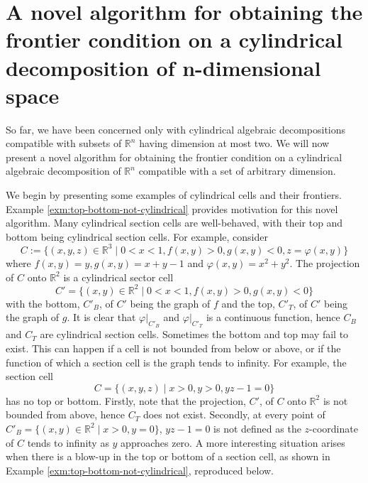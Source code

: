 \documentclass[
]{book}
\theoremstyle{definition}
\theoremstyle{definition}
\theoremstyle{definition}
\theoremstyle{definition}
\theoremstyle{remark}
\begin{document}
\hypertarget{sec:novel-frontier}{%
\chapter{A novel algorithm for obtaining the frontier condition on a cylindrical decomposition of n-dimensional space}\label{sec:novel-frontier}}

So far, we have been concerned only with cylindrical algebraic decompositions compatible with subsets of \(\mathbb{R}^n\) having dimension at most two. We will now present a novel algorithm for obtaining the frontier condition on a cylindrical algebraic decomposition of \(\mathbb{R}^n\) compatible with a set of arbitrary dimension.

We begin by presenting some examples of cylindrical cells and their frontiers. Example \ref{exm:top-bottom-not-cylindrical} provides motivation for this novel algorithm.
Many cylindrical section cells are well-behaved, with their top and bottom being cylindrical section cells.
For example, consider
\[
C := \{ (x,y,z) \in \mathbb{R}^3 \mid 0 < x < 1, f(x,y) > 0, g(x,y) < 0, z = \varphi(x,y) \}
\]
where \(f(x,y) = y, g(x,y) = x + y - 1\) and \(\varphi(x,y) = x^2 + y^2\).
The projection of \(C\) onto \(\mathbb{R}^2\) is a cylindrical sector cell
\[
C' = \{ (x,y) \in \mathbb{R}^2 \mid 0 < x < 1, f(x,y) > 0, g(x,y) < 0 \}
\]
with the bottom, \(C'_B\), of \(C'\) being the graph of \(f\) and the top, \(C'_T\), of \(C'\) being the graph of \(g\). It is clear that \(\varphi\vert_{C'_B}\) and \(\varphi\vert_{C'_T}\) is a continuous function, hence \(C_B\) and \(C_T\) are cylindrical section cells.
Sometimes the bottom and top may fail to exist. This can happen if a cell is not bounded from below or above, or if the function of which a section cell is the graph tends to infinity. For example, the section cell
\[
C = \{ (x,y,z) \mid x > 0, y > 0, y z - 1 = 0 \}
\]
has no top or bottom. Firstly, note that the projection, \(C'\), of \(C\) onto \(\mathbb{R}^2\) is not bounded from above, hence \(C_T\) does not exist. Secondly, at every point of \(C'_B = \{ (x,y) \in \mathbb{R}^2 \mid x > 0, y = 0 \}\), \(yz - 1 = 0\) is not defined as the \(z\)-coordinate of \(C\) tends to infinity as \(y\) approaches zero.
A more interesting situation arises when there is a blow-up in the top or bottom of a section cell, as shown in Example \ref{exm:top-bottom-not-cylindrical}, reproduced below.
\end{document}

